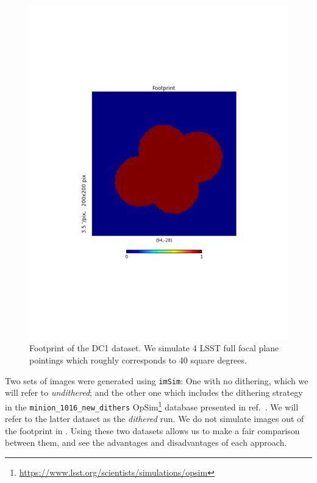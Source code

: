 \documentclass[\docopts]{\docclass}
\begin{document}
\begin{figure}
\centering
\includegraphics[trim={4cm, 6cm, 4cm, 6cm},clip,width=0.9\columnwidth]{footprint.pdf}
\caption{Footprint of the DC1 dataset. We simulate 4 LSST full focal plane pointings which roughly corresponds to 40 square degrees.}
\label{fig:footprint}
\end{figure}

Two sets of images were generated using \texttt{imSim}: One with no dithering, which we will refer to \textit{undithered}; and the other one which includes the dithering strategy in the \texttt{minion\_1016\_new\_dithers} OpSim\footnote{\url{https://www.lsst.org/scientists/simulations/opsim}} database presented in ref.~\citep{2016ApJ...829...50A}. We will refer to the latter dataset as the \textit{dithered} run. We do not simulate images out of the footprint in . Using these two datasets allows us to make a fair comparison between them, and see the advantages and disadvantages of each approach.
\end{document}
